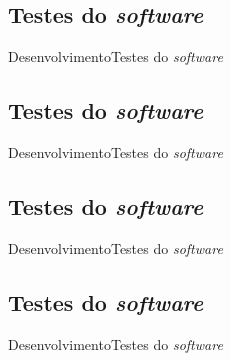 \subsection{Testes do \textit{software}}
\begin{frame}{Desenvolvimento}{Testes do \textit{software}}

\end{frame}

\subsection{Testes do \textit{software}}
\begin{frame}{Desenvolvimento}{Testes do \textit{software}}

\end{frame}

\subsection{Testes do \textit{software}}
\begin{frame}{Desenvolvimento}{Testes do \textit{software}}

\end{frame}

\subsection{Testes do \textit{software}}
\begin{frame}{Desenvolvimento}{Testes do \textit{software}}

\end{frame}
